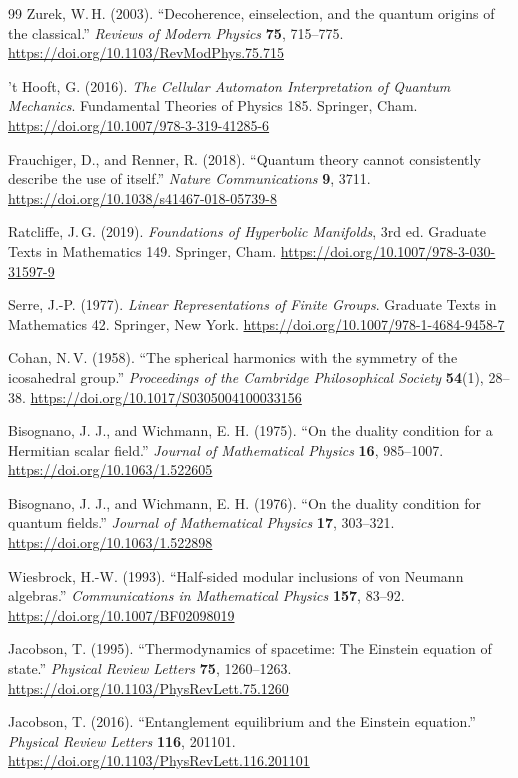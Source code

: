 \documentclass[11pt]{article}
\theoremstyle{definition}
\theoremstyle{remark}
\begin{document}
{\begin{thebibliography}{99}
Zurek, W.\,H. (2003). ``Decoherence, einselection, and the quantum
origins of the classical.'' \emph{Reviews of Modern Physics}
\textbf{75}, 715--775.
\url{https://doi.org/10.1103/RevModPhys.75.715}

't Hooft, G. (2016). \emph{The Cellular Automaton Interpretation of
Quantum Mechanics}. Fundamental Theories of Physics 185. Springer, Cham.
\url{https://doi.org/10.1007/978-3-319-41285-6}

Frauchiger, D., and Renner, R. (2018). ``Quantum theory cannot
consistently describe the use of itself.'' \emph{Nature Communications}
\textbf{9}, 3711.
\url{https://doi.org/10.1038/s41467-018-05739-8}

Ratcliffe, J.\,G. (2019). \emph{Foundations of Hyperbolic Manifolds},
3rd ed. Graduate Texts in Mathematics 149. Springer, Cham.
\url{https://doi.org/10.1007/978-3-030-31597-9}

Serre, J.-P. (1977). \emph{Linear Representations of Finite Groups}.
Graduate Texts in Mathematics 42. Springer, New York.
\url{https://doi.org/10.1007/978-1-4684-9458-7}

Cohan, N.\,V. (1958). ``The spherical harmonics with the symmetry of the
icosahedral group.'' \emph{Proceedings of the Cambridge Philosophical
Society} \textbf{54}(1), 28--38.
\url{https://doi.org/10.1017/S0305004100033156}

Bisognano, J. J., and Wichmann, E. H. (1975). ``On the duality condition for
a Hermitian scalar field.'' \emph{Journal of Mathematical Physics}
\textbf{16}, 985--1007.
\url{https://doi.org/10.1063/1.522605}

Bisognano, J. J., and Wichmann, E. H. (1976). ``On the duality condition for
quantum fields.'' \emph{Journal of Mathematical Physics} \textbf{17},
303--321.
\url{https://doi.org/10.1063/1.522898}

Wiesbrock, H.-W. (1993). ``Half-sided modular inclusions of von Neumann
algebras.'' \emph{Communications in Mathematical Physics} \textbf{157},
83--92.
\url{https://doi.org/10.1007/BF02098019}

Jacobson, T. (1995). ``Thermodynamics of spacetime: The Einstein equation of
state.'' \emph{Physical Review Letters} \textbf{75}, 1260--1263.
\url{https://doi.org/10.1103/PhysRevLett.75.1260}

Jacobson, T. (2016). ``Entanglement equilibrium and the Einstein equation.''
\emph{Physical Review Letters} \textbf{116}, 201101.
\url{https://doi.org/10.1103/PhysRevLett.116.201101}


\end{thebibliography}}
\end{document}
